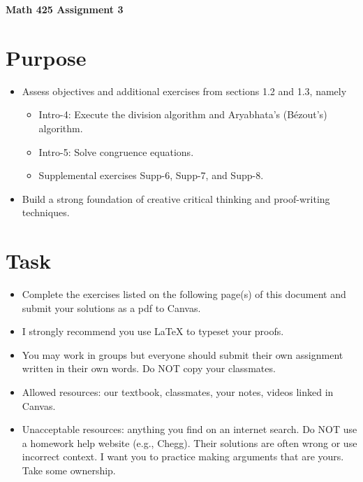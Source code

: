 \documentclass[12pt]{article}
\begin{document}
	\begin{center}
		{\Large \bf Math 425 Assignment 3}
	\end{center}
	\section*{Purpose}
		\begin{itemize}
			\item Assess objectives and additional exercises from sections 1.2 and 1.3, namely
				\begin{itemize}
					\item Intro-4: Execute the division algorithm and Aryabhata’s (Bézout’s) algorithm.
					\item Intro-5: Solve congruence equations.
					\item Supplemental exercises Supp-6, Supp-7, and Supp-8. 
				\end{itemize}
			\item Build a strong foundation of creative critical thinking and proof-writing techniques.
		\end{itemize}
	\section*{Task}
		\begin{itemize}
			\item Complete the exercises listed on the following page(s) of this document and submit your solutions as a pdf to Canvas.
			\item I strongly recommend you use LaTeX to typeset your proofs.
			\item You may work in groups but everyone should submit their own assignment written in their own words.  Do NOT copy your classmates.
			\item Allowed resources: our textbook, classmates, your notes, videos linked in Canvas.
			\item Unacceptable resources: anything you find on an internet search. Do NOT use a homework help website (e.g., Chegg). Their solutions are often wrong or use incorrect context.  I want you to practice making arguments that are yours. Take some ownership.
		\end{itemize}
\end{document}
